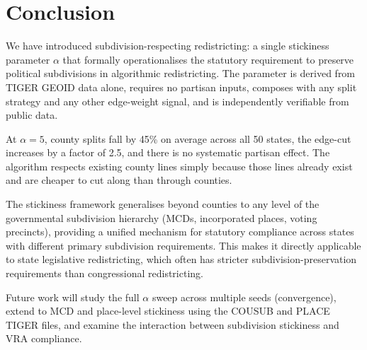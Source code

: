 \section{Conclusion}
\label{sec:conclusion}

We have introduced subdivision-respecting redistricting: a single stickiness
parameter $\alpha$ that formally operationalises the statutory requirement to
preserve political subdivisions in algorithmic redistricting.
The parameter is derived from TIGER GEOID data alone, requires no partisan
inputs, composes with any split strategy and any other edge-weight signal,
and is independently verifiable from public data.

At $\alpha = 5$, county splits fall by 45\% on average across all 50 states,
the edge-cut increases by a factor of 2.5, and there is no systematic partisan
effect.
The algorithm respects existing county lines simply because those lines already
exist and are cheaper to cut along than through counties.

The stickiness framework generalises beyond counties to any level of the
governmental subdivision hierarchy (MCDs, incorporated places, voting precincts),
providing a unified mechanism for statutory compliance across states with
different primary subdivision requirements.
This makes it directly applicable to state legislative redistricting, which
often has stricter subdivision-preservation requirements than congressional
redistricting.

Future work will study the full $\alpha$ sweep across multiple seeds (convergence),
extend to MCD and place-level stickiness using the COUSUB and PLACE TIGER files,
and examine the interaction between subdivision stickiness and VRA compliance.
